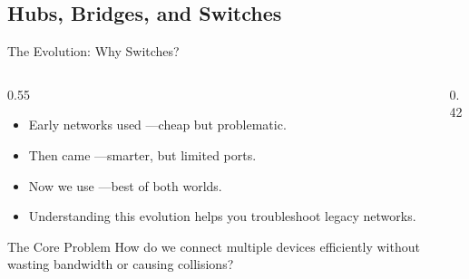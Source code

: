 \documentclass[aspectratio=169]{beamer}  %
\begin{document}
\subsection{Hubs, Bridges, and Switches}


\begin{frame}{The Evolution: Why Switches?}
    \begin{columns}[T]
        \begin{column}{0.55\textwidth}
            \begin{itemize}
                \item Early networks used ---cheap but problematic.
                \item Then came ---smarter, but limited ports.
                \item Now we use ---best of both worlds.
                \item Understanding this evolution helps you troubleshoot legacy networks.
            \end{itemize}
            
            \vspace{0.3em}
            \begin{block}{The Core Problem}
                How do we connect multiple devices efficiently without wasting bandwidth or causing collisions?
            \end{block}
        \end{column}
        \begin{column}{0.42\textwidth}
            \begin{center}
\end{center}
\end{column}
\end{columns}
\end{frame}
\end{document}
